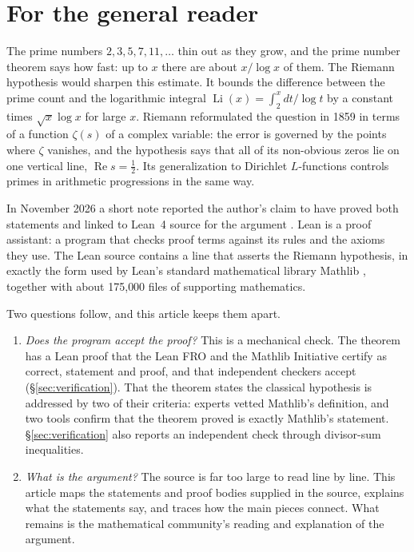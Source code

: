 \section{For the general reader}\label{sec:general}

The prime numbers $2,3,5,7,11,\dots$ thin out as they grow, and the prime number theorem says
how fast: up to $x$ there are about $x/\log x$ of them. The Riemann hypothesis would sharpen this
estimate. It bounds the difference between the prime count and the logarithmic integral
$\operatorname{Li}(x)=\int_2^x dt/\log t$ by a constant times $\sqrt{x}\log x$ for large $x$.
Riemann reformulated the question in 1859 in terms of a function $\zeta(s)$ of a
complex variable: the error is governed by the points where $\zeta$ vanishes, and the hypothesis
says that all of its non-obvious zeros lie on one vertical line, $\operatorname{Re}s=\tfrac12$.
Its generalization to Dirichlet $L$-functions controls primes in arithmetic progressions in the
same way.

In November 2026 a short note \cite{remark} reported the author's claim to have proved both
statements and linked to Lean~4 source for the argument \cite{alpotree,lean4}. Lean is a proof
assistant: a program that checks proof terms against its rules and the axioms they use. The Lean
source contains a line that
asserts the Riemann hypothesis, in exactly the form used by Lean's standard mathematical library
Mathlib \cite{mathlib2020}, together with about 175{,}000 files of supporting mathematics.

Two questions follow, and this article keeps them apart.
\begin{enumerate}
\item \emph{Does the program accept the proof?} This is a mechanical check. The theorem has a Lean
  proof that the Lean FRO and the Mathlib Initiative certify as correct, statement and proof, and
  that independent checkers accept (\S\ref{sec:verification}). That the theorem states the classical
  hypothesis is addressed by two of their criteria: experts vetted Mathlib's definition, and two
  tools confirm that the theorem proved is exactly Mathlib's statement. \S\ref{sec:verification}
  also reports an independent check through divisor-sum inequalities.
\item \emph{What is the argument?} The source is far too large to read line by line. This article
  maps the statements and proof bodies supplied in the source, explains what the statements say,
  and traces how the main pieces connect. What remains is the mathematical community's reading and
  explanation of the argument.
\end{enumerate}

